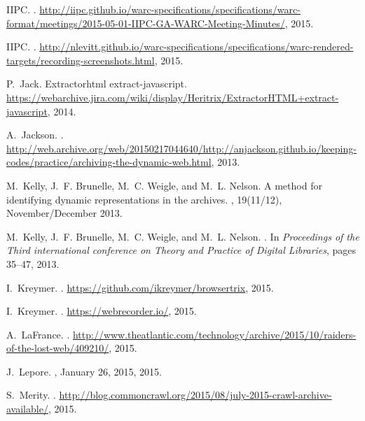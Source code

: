 \documentclass{sig-alternate}
\begin{document}
\begin{thebibliography}{10}
{IIPC}.
.
\newblock
  \url{http://iipc.github.io/warc-specifications/specifications/warc-format/meetings/2015-05-01-IIPC-GA-WARC-Meeting-Minutes/},
  2015.

{IIPC}.
.
\newblock
  \url{http://nlevitt.github.io/warc-specifications/specifications/warc-rendered-targets/recording-screenshots.html},
  2015.

P.~Jack.
\newblock Extractorhtml extract-javascript.
\newblock
  \url{https://webarchive.jira.com/wiki/display/Heritrix/ExtractorHTML+extract-javascript},
  2014.

A.~Jackson.
.
\newblock
  \url{http://web.archive.org/web/20150217044640/http://anjackson.github.io/keeping-codes/practice/archiving-the-dynamic-web.html},
  2013.

M.~Kelly, J.~F. Brunelle, M.~C. Weigle, and M.~L. Nelson.
\newblock A method for identifying dynamic representations in the archives.
, 19(11/12), November/December 2013.

M.~Kelly, J.~F. Brunelle, M.~C. Weigle, and M.~L. Nelson.
.
\newblock In {\em {Proceedings of the Third international conference on Theory
  and Practice of Digital Libraries}}, pages 35--47, 2013.

I.~Kreymer.
.
\newblock \url{https://github.com/ikreymer/browsertrix}, 2015.

I.~Kreymer.
.
\newblock \url{https://webrecorder.io/}, 2015.

A.~LaFrance.
.
\newblock
  \url{http://www.theatlantic.com/technology/archive/2015/10/raiders-of-the-lost-web/409210/},
  2015.

J.~Lepore.
, January 26, 2015, 2015.

S.~Merity.
.
\newblock
  \url{http://blog.commoncrawl.org/2015/08/july-2015-crawl-archive-available/},
  2015.


\end{thebibliography}
\end{document}
